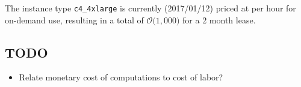 \documentclass[12pt,a4paper]{article}
\begin{document}
The instance type \verb|c4_4xlarge| is currently (2017/01/12) priced at  per hour for on-demand use, resulting in a total of $\mathcal{O}($\textdollar $1,000) $ for a 2 month lease.


\subsection{TODO}

\begin{itemize}
	\item Relate monetary cost of computations to cost of labor?
\end{itemize}

	


\end{document}
